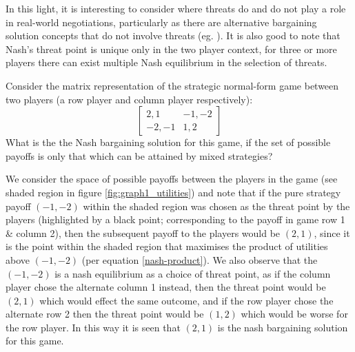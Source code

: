 In this light, it is interesting to consider where threats do and do not play a role in real-world negotiations, particularly as there are alternative bargaining solution concepts that do not involve threats (eg. \cite{bozbay}). 
It is also good to note that Nash's threat point is unique only in the two player context, for three or more players there can exist multiple Nash equilibrium in the selection of threats.\cite{10.2307/43616981}\\


\begin{example}
Consider the matrix representation of the strategic normal-form game between two players (a row player and column player respectively):
\begin{equation}\label{eq:example_game1} \begin{bmatrix}2,1 & -1,-2\\ -2,-1 & 1,2\end{bmatrix} \end{equation}
What is the the Nash bargaining solution for this game, if the set of possible payoffs is only that which can be attained by mixed strategies?\end{example}
\begin{solution}
We consider the space of possible payoffs between the players in the game (see shaded region in figure \ref{fig:graph1_utilities})
and note that if the pure strategy payoff $(-1,-2)$ within the shaded region was chosen as the threat point by the players (highlighted by a black point; corresponding to the payoff in game row 1 \& column 2), then the subsequent payoff to the players would be $(2,1)$, since it is the point within the shaded region that maximises the product of utilities above $(-1,-2)$ (per equation \ref{nash-product}).
We also observe that the $(-1,-2)$ is a nash equilibrium as a choice of threat point, as if the column player chose the alternate column 1 instead, then the threat point would be $(2,1)$ which would effect the same outcome, and if the row player chose the alternate row 2 then the threat point would be $(1,2)$ which would be worse for the row player.
In this way it is seen that $(2,1)$ is the nash bargaining solution for this game.
\end{solution}
\vspace{2mm}

